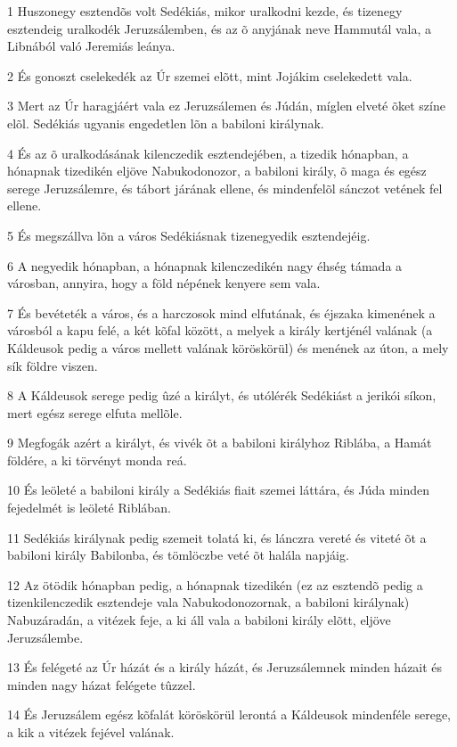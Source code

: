 \par 1 Huszonegy esztendõs volt Sedékiás, mikor uralkodni kezde, és tizenegy esztendeig uralkodék Jeruzsálemben, és az õ anyjának neve Hammutál vala, a Libnából való Jeremiás leánya.
\par 2 És gonoszt cselekedék az Úr szemei elõtt, mint Jojákim cselekedett vala.
\par 3 Mert az Úr haragjáért vala ez Jeruzsálemen és Júdán, míglen elveté õket színe elõl. Sedékiás ugyanis engedetlen lõn a babiloni királynak.
\par 4 És az õ uralkodásának kilenczedik esztendejében, a tizedik hónapban, a hónapnak tizedikén eljöve Nabukodonozor, a babiloni király, õ maga és egész serege Jeruzsálemre, és tábort járának ellene, és mindenfelõl sánczot vetének fel ellene.
\par 5 És megszállva lõn a város Sedékiásnak tizenegyedik esztendejéig.
\par 6 A negyedik hónapban, a hónapnak kilenczedikén nagy éhség támada a városban, annyira, hogy a föld népének kenyere sem vala.
\par 7 És bevéteték a város, és a harczosok mind elfutának, és éjszaka kimenének a városból a kapu felé, a két kõfal között, a melyek a király kertjénél valának (a Káldeusok pedig a város mellett valának köröskörül) és menének az úton, a mely sík földre viszen.
\par 8 A Káldeusok serege pedig ûzé a királyt, és utólérék Sedékiást a jerikói síkon, mert egész serege elfuta mellõle.
\par 9 Megfogák azért a királyt, és vivék õt a babiloni királyhoz Riblába, a Hamát földére, a ki törvényt monda reá.
\par 10 És leöleté a babiloni király a Sedékiás fiait szemei láttára, és Júda minden fejedelmét is leöleté Riblában.
\par 11 Sedékiás királynak pedig szemeit tolatá ki, és lánczra vereté és viteté õt a babiloni király Babilonba, és tömlöczbe veté õt halála napjáig.
\par 12 Az ötödik hónapban pedig, a hónapnak tizedikén (ez az esztendõ pedig a tizenkilenczedik esztendeje vala Nabukodonozornak, a babiloni királynak) Nabuzáradán, a vitézek feje, a ki áll vala a babiloni király elõtt, eljöve Jeruzsálembe.
\par 13 És felégeté az Úr házát és a király házát, és Jeruzsálemnek minden házait és minden nagy házat felégete tûzzel.
\par 14 És Jeruzsálem egész kõfalát köröskörül lerontá a Káldeusok mindenféle serege, a kik a vitézek fejével valának.

